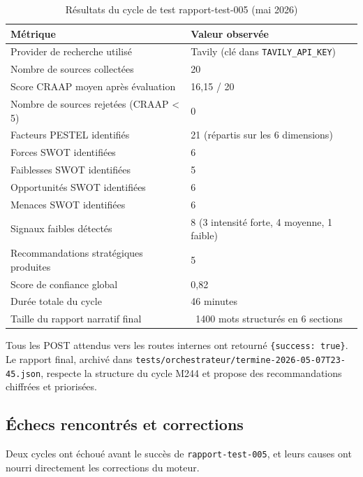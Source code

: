 \documentclass[12pt,a4paper,openany]{report}
\begin{document}
\begin{table}[H]
  \centering
  \caption{Résultats du cycle de test rapport-test-005 (mai 2026)}
  \label{tab:resultats-test-005}
  \small
  \begin{tabularx}{\linewidth}{lY}
    \toprule
    \textbf{Métrique} & \textbf{Valeur observée} \\
    \midrule
    Provider de recherche utilisé & Tavily (clé dans \texttt{TAVILY\_API\_KEY}) \\
    Nombre de sources collectées & 20 \\
    Score CRAAP moyen après évaluation & 16{,}15 / 20 \\
    Nombre de sources rejetées (CRAAP < 5) & 0 \\
    Facteurs PESTEL identifiés & 21 (répartis sur les 6 dimensions) \\
    Forces SWOT identifiées & 6 \\
    Faiblesses SWOT identifiées & 5 \\
    Opportunités SWOT identifiées & 6 \\
    Menaces SWOT identifiées & 6 \\
    Signaux faibles détectés & 8 (3 intensité forte, 4 moyenne, 1 faible) \\
    Recommandations stratégiques produites & 5 \\
    Score de confiance global & 0{,}82 \\
    Durée totale du cycle & 46 minutes \\
    Taille du rapport narratif final & ~1400 mots structurés en 6 sections \\
    \bottomrule
  \end{tabularx}
\end{table}

Tous les POST attendus vers les routes internes ont retourné \texttt{\{success: true\}}. Le rapport final, archivé dans \texttt{tests/orchestrateur/termine-2026-05-07T23-45.json}, respecte la structure du cycle M244 et propose des recommandations chiffrées et priorisées.

\subsection{Échecs rencontrés et corrections}
\label{sec:tests-echecs}

Deux cycles ont échoué avant le succès de \texttt{rapport-test-005}, et leurs causes ont nourri directement les corrections du moteur.
\end{document}
